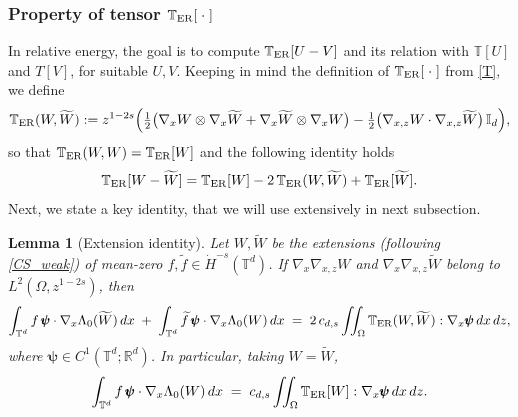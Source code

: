 \documentclass[12pt,a4paper,twoside]{article}
\newtheorem{lemma}[thm]{Lemma}
\numberwithin{equation}{section}%
\newcommand{\T}{\mathbb{T}}
\newcommand{\Gradx}{\nabla_x}
\newcommand{\Gradxz}{\nabla_{x,z}}
\newcommand{\Lambdaz}{\Lambda_0}
\begin{document}
	\subsubsection*{Property of tensor $\T_{\rm ER}[\;\cdot\;]$}
In relative energy, the goal is to compute $\T_{\rm ER}[U-V]$ and its relation with $\T[U]$ and $T[V]$, for suitable $U,V$.
Keeping in mind the definition of $\T_{\rm ER}[\;\cdot\;]$ from \eqref{T}, we define
\begin{equation}\label{TUV-def}
	\T_{\rm ER}(W,\widetilde{W}) := z^{1-2s}\Big(
	\tfrac12\big(\Gradx W\otimes\Gradx \widetilde{W} + \Gradx \widetilde{W}\otimes\Gradx W\big)
	- \tfrac12\big(\Gradxz W\cdot\Gradxz \widetilde{W}\big)\,\mathbb I_d \Big),
\end{equation}
so that $\T_{\rm ER}(W,W)=\T_{\rm ER}[W]$ and the following identity holds
\begin{equation}\label{Tpolar}
	\T_{\rm ER}[W-\widetilde{W}] = \T_{\rm ER}[W] - 2\,\T_{\rm ER}(W,\widetilde{W}) + \T_{\rm ER}[\widetilde{W}] .
\end{equation}
Next, we state a key identity, that we will use extensively in next subsection. 
\begin{lemma}[Extension identity]\label{lem:stress-id}
	Let $W, \widetilde{W}$ be the extensions (following \eqref{CS_weak}) of mean-zero $f, \widetilde{f} \in \dot H^{-s}(\mathbb T^d)$. If $\Gradx\Gradxz W$ and $\Gradx\Gradxz \widetilde{W}$ belong to $L^2(\Omega, z^{1-2s})$, then
	\begin{equation}\label{stress-id}
		\int_{\mathbb T^d} f\,\pmb\psi\cdot\Gradx\Lambdaz(\widetilde{W})\,dx
		\;+\; \int_{\mathbb T^d} \widetilde{f}\,\pmb\psi\cdot\Gradx\Lambdaz(W)\,dx
		\;=\; 2\,c_{d,s}\iint_\Omega \T_{\rm ER}(W,\widetilde{W}) : \Gradx\pmb\psi \,dx\,dz,
	\end{equation}
	where $\pmb\psi\in C^1(\mathbb T^d;\mathbb R^d)$.
	In particular, taking $W=\widetilde{W}$,
	\begin{equation}\label{stress-id2}
		\int_{\mathbb T^d} f\,\pmb\psi\cdot\Gradx\Lambdaz(W)\,dx
		\;=\; c_{d,s}\iint_\Omega \T_{\rm ER}[W] : \Gradx\pmb\psi \,dx\,dz .
	\end{equation}
\end{lemma}
\end{document}
